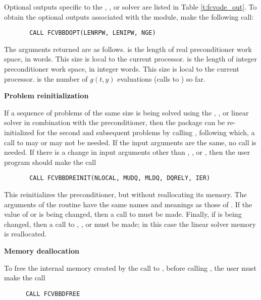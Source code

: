 \begin{Steps}
  Optional outputs specific to the {\spgmr}, {\spbcg}, or {\sptfqmr} solver are 
  listed in Table \ref{t:fcvode_out}.
  To obtain the optional outputs associated with the {\cvbbdpre} module, make
  the following call:
\begin{verbatim}
       CALL FCVBBDOPT(LENRPW, LENIPW, NGE)
\end{verbatim}
  The arguments returned are as follows.
   is the length of real preconditioner work space, in 
  words.  This size is local to the current processor.
   is the length of integer preconditioner work space, in integer
  words.  This size is local to the current processor.
   is the number of $g(t,y)$ evaluations (calls to ) so far.
  
\item {\bf Problem reinitialization}
  
  If a sequence of problems of the same size is being solved using the {\spgmr},
  {\spbcg}, or {\sptfqmr} linear solver in combination with the {\cvbbdpre} preconditioner, then the
  {\cvode} package can be re-initialized for the second and subsequent problems
  by calling , following which, a call to  may or 
  may not be needed.
  If the input arguments are the same, no  call is needed.
  If there is a change in input arguments other than , , or
  , then the user program should make the call 
\begin{verbatim}
       CALL FCVBBDREINIT(NLOCAL, MUDQ, MLDQ, DQRELY, IER)
\end{verbatim}
  This reinitializes the {\cvbbdpre} preconditioner, but without
  reallocating its memory.  The arguments of the 
  routine have the same names and meanings as those of .
  If the value of  or  is being changed, then a call to
   must be made.  Finally, if  is being
  changed, then a call to , , or
   must be made; in this case
  the linear solver memory is reallocated.
  
\item {\bf Memory deallocation}

  To free the internal memory created by the call to , before
  calling , the user must make the call
\begin{verbatim}
      CALL FCVBBDFREE
\end{verbatim}

\end{Steps}
